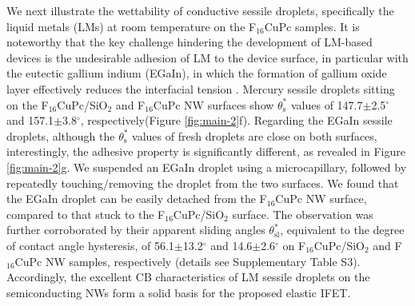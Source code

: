 \documentclass[journal=nalefd,manuscript=letter,email=true,hyperref=true,keywords=true]{achemso}
\begin{document}
We next illustrate the wettability of conductive sessile droplets,
specifically the liquid metals (LMs) at room temperature on the
F\(_{\text{16}}\)CuPc samples. It is noteworthy that the key challenge hindering
the development of LM-based devices is the undesirable adhesion of LM
to the device surface, in particular with the eutectic gallium indium
(EGaIn), in which the formation of gallium oxide layer effectively
reduces the interfacial tension
\cite{Dickey_2008,Doudrick_2014_oxide}. Mercury sessile droplets
sitting on the F\(_{\text{16}}\)CuPc/SiO\(_{\text{2}}\) and F\(_{\text{16}}\)CuPc NW surfaces show
\(\theta_{\mathrm{s}}^{*}\) values of 147.7\(\pm\)2.5\(^{\circ}\) and
157.1\(\pm\)3.8\(^{\circ}\), respectively(Figure \ref{fig:main-2}f).
Regarding the EGaIn sessile droplets, although the
\(\theta_{\mathrm{s}}^{*}\) values of fresh droplets are close on both
surfaces, interestingly, the adhesive property is significantly
different, as revealed in Figure \ref{fig:main-2}g. We suspended an EGaIn
droplet using a microcapillary, followed by repeatedly
touching/removing the droplet from the two surfaces. We found that
the EGaIn droplet can be easily detached from the F\(_{\text{16}}\)CuPc NW
surface, compared to that stuck to the F\(_{\text{16}}\)CuPc/SiO\(_{\text{2}}\)
surface. The observation was further corroborated by their apparent
sliding angles \(\theta_{\mathrm{sl}}^{*}\), equivalent to the degree
of contact angle hysteresis, of 56.1\(\pm\)13.2\(^{\circ}\) and
14.6\(\pm\)2.6\(^{\circ}\) on F\(_{\text{16}}\)CuPc/SiO\(_{\text{2}}\) and F\(_{\text{16}}\)CuPc NW
samples, respectively (details see Supplementary Table
S3). Accordingly, the excellent CB characteristics of LM sessile
droplets on the semiconducting NWs form a solid basis for the
proposed elastic IFET.
\end{document}
